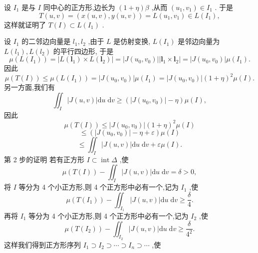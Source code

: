 设 \({I}_{1}\) 是与 \(I\) 同中心的正方形,边长为 \(\left( {1 + \eta }\right) \beta\) ,从而 \(\left( {{u}_{1},{v}_{1}}\right)  \in  {I}_{1}\) . 于是
\[
T\left( {u,v}\right)  = \left( {x\left( {u,v}\right) ,y\left( {u,v}\right) }\right)  = L\left( {{u}_{1},{v}_{1}}\right)  \in  L\left( {I}_{1}\right) ,
\]
这样就证明了 \(T\left( I\right)  \subset  L\left( {I}_{1}\right)\) .

设 \({I}_{1}\) 的二邻边向量是 \({l}_{1},{l}_{2}\) ,由于 \(L\) 是仿射变换, \(L\left( {I}_{1}\right)\) 是邻边向量为 \(L\left( {l}_{1}\right) ,L\left( {l}_{2}\right)\) 的平行四边形, 于是
\[
\mu \left( {L\left( {I}_{1}\right) }\right)  = \left| {L\left( {\mathbf{l}}_{1}\right)  \times  L\left( {\mathbf{l}}_{2}\right) }\right|  = \left| {J\left( {{u}_{0},{v}_{0}}\right) }\right| \left| {{\mathbf{l}}_{1} \times  {\mathbf{l}}_{2}}\right|  = \left| {J\left( {{u}_{0},{v}_{0}}\right) }\right| \mu \left( {I}_{1}\right) .
\]
因此
\[
\mu \left( {T\left( I\right) }\right)  \leq  \mu \left( {L\left( {I}_{1}\right) }\right)  = \left| {J\left( {{u}_{0},{v}_{0}}\right) }\right| \mu \left( {I}_{1}\right)  = \left| {J\left( {{u}_{0},{v}_{0}}\right) }\right| {\left( 1 + \eta \right) }^{2}\mu \left( I\right) .
\]
另一方面,我们有
\[
{\iint }_{I}\left| {J\left( {u,v}\right) }\right| \mathrm{d}u\mathrm{\;d}v \geq  \left( {\left| {J\left( {{u}_{0},{v}_{0}}\right) }\right|  - \eta }\right) \mu \left( I\right) ,
\]
因此
\[
\mu \left( {T\left( I\right) }\right)  \leq  \left| {J\left( {{u}_{0},{v}_{0}}\right) }\right| {\left( 1 + \eta \right) }^{2}\mu \left( I\right)
\]
\[
\leq  \left( {\left| {J\left( {{u}_{0},{v}_{0}}\right) }\right|  - \eta  + \varepsilon }\right) \mu \left( I\right)
\]
\[
\leq  {\iint }_{I}\left| {J\left( {u,v}\right) }\right| \mathrm{d}u\mathrm{\;d}v + {\varepsilon \mu }\left( I\right) .
\]
第 2 步的证明 若有正方形 \(I \subset  \operatorname{int}\Delta\) ,使
\[
\mu \left( {T\left( I\right) }\right)  - {\iint }_{I}\left| {J\left( {u,v}\right) }\right| \mathrm{d}u\mathrm{\;d}v = \delta  > 0,
\]
将 \(I\) 等分为 4 个小正方形,则 4 个正方形中必有一个,记为 \({I}_{1}\) ,使
\[
\mu \left( {T\left( {I}_{1}\right) }\right)  - {\iint }_{{I}_{1}}\left| {J\left( {u,v}\right) }\right| \mathrm{d}u\mathrm{\;d}v \geq  \frac{\delta }{4}.
\]
再将 \({I}_{1}\) 等分为 4 个小正方形,则 4 个正方形中必有一个,记为 \({I}_{2}\) ,使
\[
\mu \left( {T\left( {I}_{2}\right) }\right)  - {\iint }_{{I}_{2}}\left| {J\left( {u,v}\right) }\right| \mathrm{d}u\mathrm{\;d}v \geq  \frac{\delta }{{4}^{2}}.
\]
这样我们得到正方形序列 \({I}_{1} \supset  {I}_{2} \supset  \cdots  \supset  {I}_{n} \supset  \cdots\) ,使
